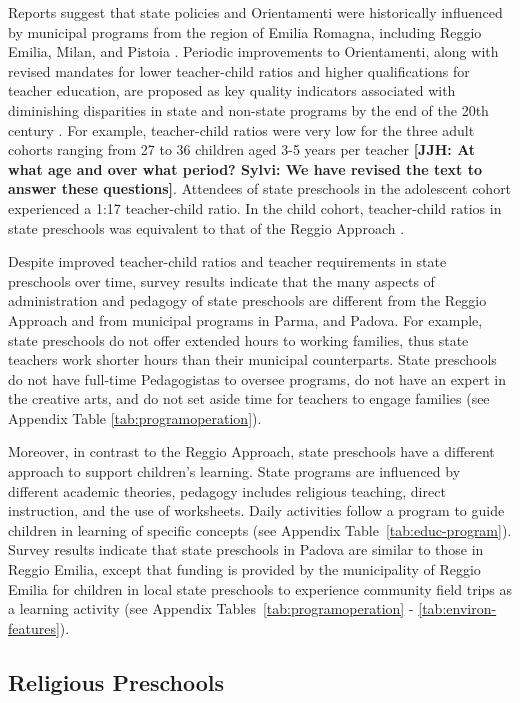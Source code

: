 Reports suggest that state policies and Orientamenti were historically influenced by municipal programs from the region of Emilia Romagna, including Reggio Emilia, Milan, and Pistoia \citep{OECD_2001_Italy-Country-Note}. Periodic improvements to Orientamenti, along with revised mandates for lower teacher-child ratios and higher qualifications for teacher education, are proposed as key quality indicators associated with diminishing disparities in state and non-state programs by the end of the 20th century \citep{Hohnerlein_2015_Development-and-Diffusion}. For example, teacher-child ratios were very low for the three adult cohorts ranging from 27 to 36 children aged 3-5 years per teacher \textbf{[JJH: At what age and over what period? Sylvi: We have revised the text to answer these questions]}. Attendees of state preschools in the adolescent cohort experienced a 1:17 teacher-child ratio. In the child cohort, teacher-child ratios in state preschools was equivalent to that of the Reggio Approach \citep{Hohnerlein_2015_Development-and-Diffusion}. 

Despite improved teacher-child ratios and teacher requirements in state preschools over time, survey results indicate that the many aspects of administration and pedagogy of state preschools are different from the Reggio Approach and from municipal programs in Parma, and Padova. For example, state preschools do not offer extended hours to working families, thus state teachers work shorter hours than their municipal counterparts. State preschools do not have full-time Pedagogistas to oversee programs, do not have an expert in the creative arts, and do not set aside time for teachers to engage families (see Appendix Table \ref{tab:programoperation}). 

Moreover, in contrast to the Reggio Approach, state preschools have a different approach to support children's learning. State programs are influenced by different academic theories, pedagogy includes religious teaching, direct instruction, and the use of worksheets. Daily activities follow a program to guide children in learning of specific concepts (see Appendix Table~\ref{tab:educ-program}). Survey results indicate that state preschools in Padova are similar to those in Reggio Emilia, except that funding is provided by the municipality of Reggio Emilia for children in local state preschools to experience community field trips as a learning activity (see Appendix Tables~\ref{tab:programoperation} - \ref{tab:environ-features}).

\subsection{Religious Preschools}


